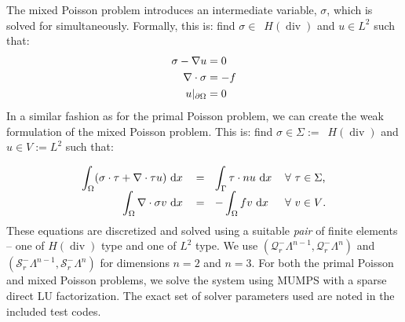 \documentclass[format=acmsmall,screen,timestamp=false,a4paper]{acmart}
\DeclareMathOperator{\Div}{div}
\newcommand\josh[1]{\textbf{\textcolor[rgb]{0,.5,1}{[Josh: #1]}}}
\newcommand\lm[1]{\textbf{\textcolor[rgb]{1,0,0.5}{[Lawrence: #1]}}}
\newcommand{\calQ}{\mathcal{Q}}
\newcommand{\calS}{\mathcal{S}}
\newcommand{\hdiv}{\ensuremath{{H}(\Div)}\xspace}
\begin{document}
The mixed Poisson problem introduces an intermediate variable, $\sigma$, which is solved for simultaneously.
Formally, this is: find $\sigma\in$~\hdiv and $u\in L^2$ such that:
\begin{align}
     \sigma - \nabla u &= 0 \notag \\
     \nabla \cdot \sigma &= -f \notag \\
     u\vert_{\partial \Omega} &= 0 \notag
\end{align}
In a similar fashion as for the primal Poisson problem, we can create the weak formulation of the mixed Poisson problem.  This is: find $\sigma \in \Sigma:=$~\hdiv and $u \in V:=L^2$ such that:

\begin{equation*}
\begin{tabular}{rllll}
$\displaystyle\int_\Omega (\sigma \cdot \tau + \nabla\cdot\tau u) \text{ d}x$ & $\displaystyle=~~ \int_\Gamma \tau \cdot n u \text{ d}x$ & $\forall~ \tau\in\Sigma$, \\
$\displaystyle\int_\Omega \nabla \cdot \sigma v \text{ d}x$ & $\displaystyle= ~~-\int_\Omega fv \text{ d}x$ & $\forall~ v\in V$.
\end{tabular}
\end{equation*}
These equations are discretized and solved using a suitable \textit{pair} of finite elements -- one of \hdiv type and one of $L^2$ type.  We use $(\calQ_r^-\Lambda^{n-1},\calQ_r^-\Lambda^n)$ and $(\calS_r^-\Lambda^{n-1},\calS_r^-\Lambda^n)$ for dimensions $n=2$ and $n=3$.
For both the primal Poisson and mixed Poisson problems, we solve the system using MUMPS with a sparse direct LU factorization.
The exact set of solver parameters used are noted in the included test codes.




\end{document}
